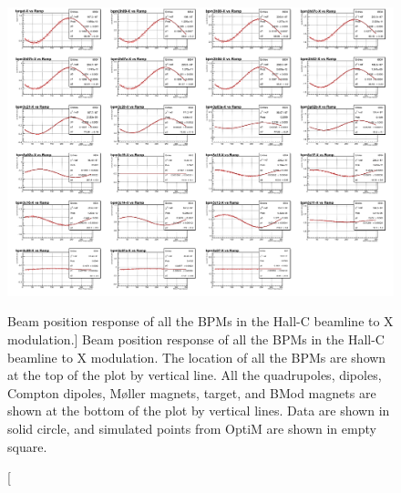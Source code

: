 \begin{singlespace}
\begin{figure}[!h]
	\begin{center}
	\includegraphics[width=15.0cm]{figures/BModBpmsX}
	\end{center}
	\caption
	[Beam position response of all the BPMs in the Hall-C beamline to X modulation.]
	{Beam position response of all the BPMs in the Hall-C beamline to X modulation. The location of all the BPMs are shown at the top of the plot by vertical line. All the quadrupoles, dipoles, Compton dipoles, M{\o}ller magnets, target, and BMod magnets are shown at the bottom of the plot by vertical lines. Data are shown in solid circle, and simulated points from OptiM are shown in empty square. }
	\label{fig:BModBpmsX}
\end{figure}
\end{singlespace}


